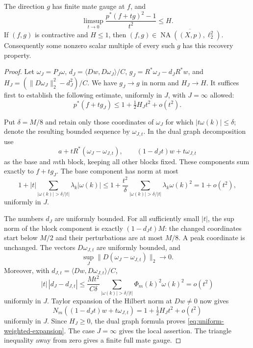 \documentclass[10pt]{amsart}
\newcommand{\NA}{\operatorname{NA}}
\begin{document}
\begin{theorem}\label{thm:weighted-recovery}
The direction $g$ has finite mate gauge at $f$, and
\[
 \limsup_{t\to0}\frac{p^*(f+tg)^2-1}{t^2}\le H.
\]
If $(f,g)$ is contractive and $H\le1$, then
$(f,g)\in\overline{\NA((X,p),\ell_2^2)}$.
Consequently some nonzero scalar multiple of every such $g$
has this recovery property.
\end{theorem}
\begin{proof}
Let $\omega_J=P_J\omega$, $d_J=\langle Dw,D\omega_J\rangle/C$,
$g_J=R^*\omega_J-d_JR^*w$, and
$H_J=(\|D\omega_J\|_2^2-d_J^2)/C$. We have $g_J\to g$
in norm and $H_J\to H$. It suffices first to establish the
following estimate, uniformly in $J$, with $J=\infty$ allowed:
\begin{equation}\label{eq:uniform-weighted-expansion}
 p^*(f+tg_J)\le1+\tfrac12H_Jt^2+o(t^2).
\end{equation}

Put $\delta=M/8$ and retain only those coordinates of $\omega_J$
for which $|t\omega(k)|\le\delta$; denote the resulting bounded
sequence by $\omega_{J,t}$. In the dual graph decomposition use
\[
 a+tR^*(\omega_J-\omega_{J,t}),\qquad
 (1-d_Jt)w+t\omega_{J,t}
\]
as the base and $m$th block, keeping all other blocks fixed.
These components sum exactly to $f+tg_J$. The base component
has norm at most
\[
 1+|t|\sum_{|\omega(k)|>\delta/|t|}\lambda_k|\omega(k)|
 \le1+\frac{t^2}{\delta}
       \sum_{|\omega(k)|>\delta/|t|}\lambda_k\omega(k)^2
 =1+o(t^2),
\]
uniformly in $J$.

The numbers $d_J$ are uniformly bounded. For all sufficiently
small $|t|$, the sup norm of the block component is exactly
$(1-d_Jt)M$: the changed coordinates start below $M/2$ and
their perturbations are at most $M/8$. A peak coordinate is
unchanged. The vectors $D\omega_{J,t}$ are uniformly bounded,
and
\[
 \sup_J\|D(\omega_J-\omega_{J,t})\|_2\longrightarrow0.
\]
Moreover, with $d_{J,t}=\langle Dw,D\omega_{J,t}\rangle/C$,
\[
 |t|\,|d_J-d_{J,t}|
 \le\frac{Mt^2}{C\delta}
       \sum_{|\omega(k)|>\delta/|t|}\Phi_m(k)^2\omega(k)^2
 =o(t^2)
\]
uniformly in $J$. Taylor expansion of the Hilbert norm at
$Dw\ne0$ now gives
\[
 N_m((1-d_Jt)w+t\omega_{J,t})
 =1+\tfrac12H_Jt^2+o(t^2)
\]
uniformly in $J$. Since $H_J\ge0$, the dual graph formula
proves \eqref{eq:uniform-weighted-expansion}. The case
$J=\infty$ gives the local assertion. The triangle inequality
away from zero gives a finite full mate gauge.


\end{proof}
\end{document}
